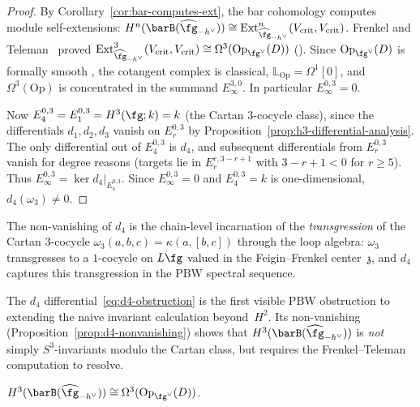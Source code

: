\begin{proof}
By Corollary~\ref{cor:bar-computes-ext}, the bar cohomology
computes module self-extensions:
$H^n(\barB(\widehat{\fg}_{-h^\vee})) \cong
\mathrm{Ext}^n_{\widehat{\fg}_{-h^\vee}}(V_{\mathrm{crit}},
V_{\mathrm{crit}})$.
Frenkel and Teleman~\cite{FT06} proved
$\mathrm{Ext}^3_{\widehat{\fg}_{-h^\vee}}(V_{\mathrm{crit}},
V_{\mathrm{crit}}) \cong \Omega^3(\mathrm{Op}_{\fg^\vee}(D))$
(\ClaimStatusProvedElsewhere).
Since $\mathrm{Op}_{\fg^\vee}(D)$ is formally smooth
\cite{FG06}, the cotangent complex is classical,
$\mathbb{L}_{\mathrm{Op}} = \Omega^1[0]$, and
$\Omega^3(\mathrm{Op})$ is concentrated in the summand
$E_\infty^{3,0}$. In particular
$E_\infty^{0,3} = 0$.

Now $E_4^{0,3} = E_1^{0,3} = H^3(\fg; k) = k$ (the Cartan
$3$-cocycle class), since the differentials $d_1, d_2, d_3$
vanish on $E_r^{0,3}$ by
Proposition~\ref{prop:h3-differential-analysis}. The only
differential out of $E_4^{0,3}$ is $d_4$, and subsequent
differentials from $E_r^{0,3}$ vanish for degree reasons
(targets lie in $E_r^{r, 3-r+1}$ with $3 - r + 1 < 0$ for
$r \geq 5$). Thus $E_\infty^{0,3} = \ker d_4|_{E_4^{0,3}}$.
Since $E_\infty^{0,3} = 0$ and $E_4^{0,3} = k$ is one-dimensional,
$d_4(\omega_3) \neq 0$.
\end{proof}

\begin{remark}
\label{rem:d4-transgression}
The non-vanishing of $d_4$ is the chain-level incarnation of the
\emph{transgression} of the Cartan $3$-cocycle
$\omega_3(a,b,c) = \kappa(a,[b,c])$ through the loop algebra:
$\omega_3$ transgresses to a $1$-cocycle on $L\fg$ valued in the
Feigin--Frenkel center~$\mathfrak{z}$, and $d_4$ captures this
transgression in the PBW spectral sequence.
\end{remark}

\begin{remark}[H3 obstruction]\label{rem:h3-obstruction}
The $d_4$ differential~\eqref{eq:d4-obstruction} is the first
visible PBW obstruction to extending the naive invariant calculation
beyond~$H^2$.
Its non-vanishing (Proposition~\ref{prop:d4-nonvanishing}) shows
that $H^3(\barB(\widehat{\fg}_{-h^\vee}))$ is \emph{not} simply
$S^3$-invariants modulo the Cartan class, but requires the
Frenkel--Teleman computation to resolve.
\end{remark}

\begin{corollary}
\label{cor:h3-oper}
$H^3(\barB(\widehat{\fg}_{-h^\vee})) \cong
\Omega^3(\mathrm{Op}_{\fg^\vee}(D))$.
\end{corollary}

